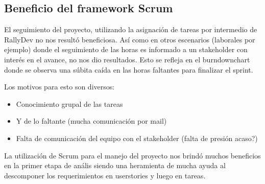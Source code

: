 \subsection{Beneficio del framework Scrum}
El seguimiento del proyecto, utilizando la asignaci\'on de tareas por intermedio de RallyDev no nos result\'o beneficiosa. As\'i como en otros escenarios (laborales por ejemplo) donde el seguimiento de las horas es informado a un stakeholder con inter\'es en el avance, no nos dio resultados. Esto se refleja en el burndownchart donde se observa una s\'ubita ca\'ida en las horas faltantes para finalizar el sprint.

Los motivos para esto son diversos:
\begin{itemize}
    \item Conocimiento grupal de las tareas 
    \item Y de lo faltante (mucha comunicaci\'on por mail)
    \item Falta de comunicaci\'on del equipo con el stakeholder (falta de presi\'on acaso?)
\end{itemize}

La utilizaci\'on de Scrum para el manejo del proyecto nos brindó muchos beneficios en la primer etapa de an\'alis siendo una heramienta de mucha ayuda al descomponer los requerimientos en userstories y luego en tareas.

